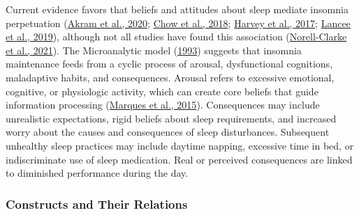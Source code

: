\documentclass[
  ,doc,11pt, twoside,floatsintext]{apa6}
\begin{document}
Current evidence favors that beliefs and attitudes about sleep mediate insomnia perpetuation (\protect\hyperlink{ref-akram2020}{Akram et al., 2020}; \protect\hyperlink{ref-chow2018}{Chow et al., 2018}; \protect\hyperlink{ref-harvey2017}{Harvey et al., 2017}; \protect\hyperlink{ref-lancee2019}{Lancee et al., 2019}), although not all studies have found this association (\protect\hyperlink{ref-norell-clarke2021}{Norell-Clarke et al., 2021}). The Microanalytic model (\protect\hyperlink{ref-morin1993}{1993}) suggests that insomnia maintenance feeds from a cyclic process of arousal, dysfunctional cognitions, maladaptive habits, and consequences. Arousal refers to excessive emotional, cognitive, or physiologic activity, which can create core beliefs that guide information processing (\protect\hyperlink{ref-marques2015}{Marques et al., 2015}). Consequences may include unrealistic expectations, rigid beliefs about sleep requirements, and increased worry about the causes and consequences of sleep disturbances. Subsequent unhealthy sleep practices may include daytime napping, excessive time in bed, or indiscriminate use of sleep medication. Real or perceived consequences are linked to diminished performance during the day.

\hypertarget{constructs-and-their-relations}{%
\subsubsection{Constructs and Their Relations}\label{constructs-and-their-relations}}
\end{document}
